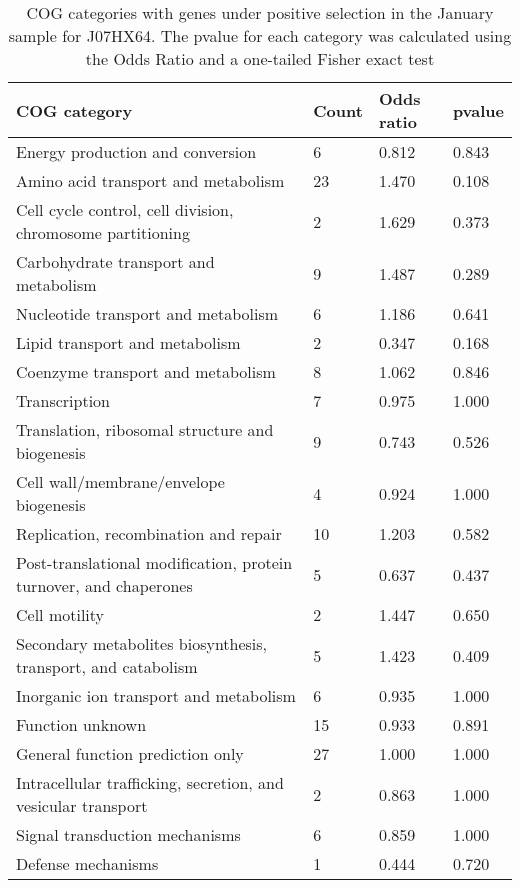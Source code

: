 \begin{table}[]
\footnotesize 
	\tabcolsep=0.11cm 
\caption{COG categories with genes under positive selection in the January sample for J07HX64. The pvalue for each category was calculated using the Odds Ratio and a one-tailed Fisher exact test \\} 
\begin{tabularx}{\textwidth}{L{6cm}R{2cm}R{2cm}R{2cm}} 
\hline 
\textbf{COG category} & \textbf{Count} & \textbf{Odds ratio} & \textbf{pvalue} \\ 
\hline 
Energy production and conversion & 6 & 0.812 & 0.843 \\ 
Amino acid transport and metabolism & 23 & 1.470 & 0.108 \\ 
Cell cycle control, cell division, chromosome partitioning & 2 & 1.629 & 0.373 \\ 
Carbohydrate transport and metabolism & 9 & 1.487 & 0.289 \\ 
Nucleotide transport and metabolism & 6 & 1.186 & 0.641 \\ 
Lipid transport and metabolism & 2 & 0.347 & 0.168 \\ 
Coenzyme transport and metabolism & 8 & 1.062 & 0.846 \\ 
Transcription & 7 & 0.975 & 1.000 \\ 
Translation, ribosomal structure and biogenesis & 9 & 0.743 & 0.526 \\ 
Cell wall/membrane/envelope biogenesis & 4 & 0.924 & 1.000 \\ 
Replication, recombination and repair & 10 & 1.203 & 0.582 \\ 
Post-translational modification, protein turnover, and chaperones & 5 & 0.637 & 0.437 \\ 
Cell motility & 2 & 1.447 & 0.650 \\ 
Secondary metabolites biosynthesis, transport, and catabolism & 5 & 1.423 & 0.409 \\ 
Inorganic ion transport and metabolism & 6 & 0.935 & 1.000 \\ 
Function unknown & 15 & 0.933 & 0.891 \\ 
General function prediction only & 27 & 1.000 & 1.000 \\ 
Intracellular trafficking, secretion, and vesicular transport & 2 & 0.863 & 1.000 \\ 
Signal transduction mechanisms & 6 & 0.859 & 1.000 \\ 
Defense mechanisms & 1 & 0.444 & 0.720 \\ 
\end{tabularx} 
\label{January_COG_Selection_J07HX64} 
 \end{table} 

